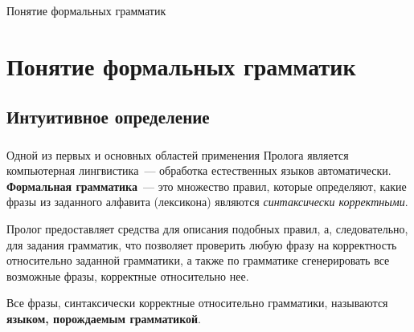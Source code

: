 

\begin{frame}

	\begin{center}
		\Huge Понятие формальных грамматик
	\end{center}

\end{frame}

\section{Понятие формальных грамматик}
\subsection{Интуитивное определение}


\begin{frame}
	
	\frametitle{\insertsection}
	\framesubtitle{\insertsubsection}
	
	Одной из первых и основных областей применения Пролога является компьютерная лингвистика~--- обработка естественных языков
	автоматически. \textbf{Формальная грамматика}~--- это множество правил, которые определяют, какие фразы из заданного алфавита (лексикона)
	являются \textit{синтаксически корректными}. 
	
	Пролог предоставляет средства для описания подобных правил, а, следовательно, для
	задания грамматик, что позволяет проверить любую фразу на корректность относительно заданной грамматики, а также по грамматике 
	сгенерировать все возможные фразы, корректные относительно нее.
	
	Все фразы, синтаксически корректные относительно грамматики, называются \textbf{языком, порождаемым грамматикой}.
	
\end{frame}

